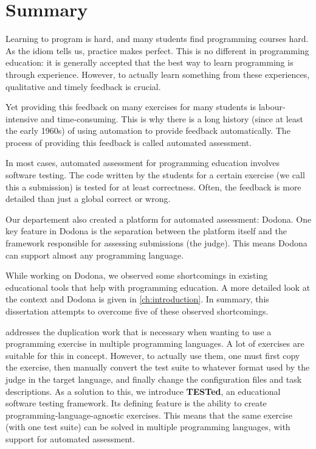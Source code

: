 \documentclass[main]{subfiles}
\begin{document}
\chapter*{Summary}\label{ch:summary}

Learning to program is hard, and many students find programming courses hard.
As the idiom tells us, practice makes perfect.
This is no different in programming education: it is generally accepted that the best way to learn programming is through experience.
However, to actually learn something from these experiences, qualitative and timely feedback is crucial.

Yet providing this feedback on many exercises for many students is labour-intensive and time-consuming.
This is why there is a long history (since at least the early 1960s) of using automation to provide feedback automatically.
The process of providing this feedback is called automated assessment.

In most cases, automated assessment for programming education involves software testing.
The code written by the students for a certain exercise (we call this a submission) is tested for at least correctness.
Often, the feedback is more detailed than just a global correct or wrong.

Our departement also created a platform for automated assessment: Dodona.
One key feature in Dodona is the separation between the platform itself and the framework responsible for assessing submissions (the judge).
This means Dodona can support almost any programming language.

While working on Dodona, we observed some shortcomings in existing educational tools that help with programming education.
A more detailed look at the context and Dodona is given in \cref{ch:introduction}.
In summary, this dissertation attempts to overcome five of these observed shortcomings.

 addresses the duplication work that is necessary when wanting to use a programming exercise in multiple programming languages.
A lot of exercises are suitable for this in concept.
However, to actually use them, one must first copy the exercise, then manually convert the test suite to whatever format used by the judge in the target language, and finally change the configuration files and task descriptions.
As a solution to this, we introduce \textbf{TESTed}, an educational software testing framework.
Its defining feature is the ability to
create programming‐language‐agnostic exercises.
This means that the same exercise (with one test suite) can be solved in multiple programming languages, with support for automated assessment.
\end{document}
